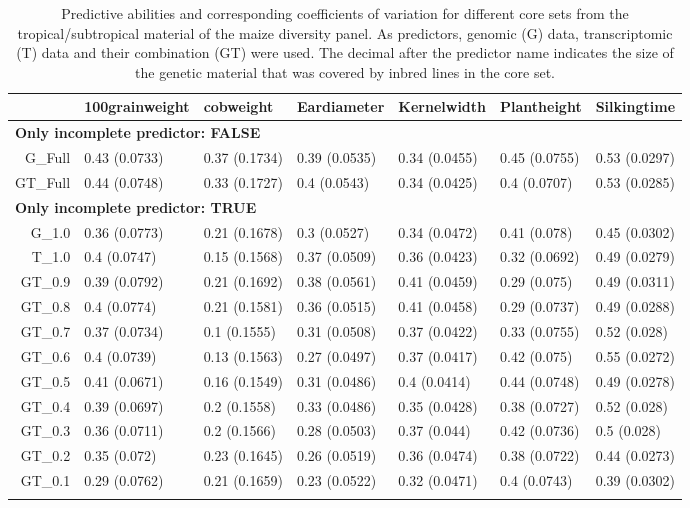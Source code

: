 \documentclass[12pt,titlepage]{article}
\begin{document}
\begin{table}[ht]
\centering
\caption{Predictive abilities and corresponding coefficients of variation for different core sets from the tropical/subtropical material of the maize diversity panel. As predictors, genomic (G) data, transcriptomic (T) data and their combination (GT) were used. The decimal after the predictor name indicates the size of the genetic material that was covered by inbred lines in the core set.} 
\begin{tabular}{rllllll}
  \toprule
 & 100grainweight & cobweight & Eardiameter & Kernelwidth & Plantheight & Silkingtime \\ 
  \midrule
\multicolumn{6}{l}{{\bfseries Only incomplete predictor: FALSE}}\\
G\_Full & 0.43 (0.0733) & 0.37 (0.1734) & 0.39 (0.0535) & 0.34 (0.0455) & 0.45 (0.0755) & 0.53 (0.0297) \\ 
  GT\_Full & 0.44 (0.0748) & 0.33 (0.1727) & 0.4 (0.0543) & 0.34 (0.0425) & 0.4 (0.0707) & 0.53 (0.0285) \\ 
   \midrule
\multicolumn{6}{l}{{\bfseries Only incomplete predictor: TRUE}}\\
G\_1.0 & 0.36 (0.0773) & 0.21 (0.1678) & 0.3 (0.0527) & 0.34 (0.0472) & 0.41 (0.078) & 0.45 (0.0302) \\ 
  T\_1.0 & 0.4 (0.0747) & 0.15 (0.1568) & 0.37 (0.0509) & 0.36 (0.0423) & 0.32 (0.0692) & 0.49 (0.0279) \\ 
  GT\_0.9 & 0.39 (0.0792) & 0.21 (0.1692) & 0.38 (0.0561) & 0.41 (0.0459) & 0.29 (0.075) & 0.49 (0.0311) \\ 
  GT\_0.8 & 0.4 (0.0774) & 0.21 (0.1581) & 0.36 (0.0515) & 0.41 (0.0458) & 0.29 (0.0737) & 0.49 (0.0288) \\ 
  GT\_0.7 & 0.37 (0.0734) & 0.1 (0.1555) & 0.31 (0.0508) & 0.37 (0.0422) & 0.33 (0.0755) & 0.52 (0.028) \\ 
  GT\_0.6 & 0.4 (0.0739) & 0.13 (0.1563) & 0.27 (0.0497) & 0.37 (0.0417) & 0.42 (0.075) & 0.55 (0.0272) \\ 
  GT\_0.5 & 0.41 (0.0671) & 0.16 (0.1549) & 0.31 (0.0486) & 0.4 (0.0414) & 0.44 (0.0748) & 0.49 (0.0278) \\ 
  GT\_0.4 & 0.39 (0.0697) & 0.2 (0.1558) & 0.33 (0.0486) & 0.35 (0.0428) & 0.38 (0.0727) & 0.52 (0.028) \\ 
  GT\_0.3 & 0.36 (0.0711) & 0.2 (0.1566) & 0.28 (0.0503) & 0.37 (0.044) & 0.42 (0.0736) & 0.5 (0.028) \\ 
  GT\_0.2 & 0.35 (0.072) & 0.23 (0.1645) & 0.26 (0.0519) & 0.36 (0.0474) & 0.38 (0.0722) & 0.44 (0.0273) \\ 
  GT\_0.1 & 0.29 (0.0762) & 0.21 (0.1659) & 0.23 (0.0522) & 0.32 (0.0471) & 0.4 (0.0743) & 0.39 (0.0302) \\ 
   \bottomrule
\multicolumn{6}{l}{}\\
\end{tabular}
\end{table}
\end{document}
